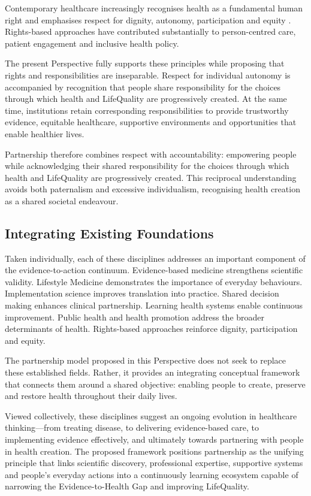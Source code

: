 \documentclass{article}
\begin{document}
Contemporary healthcare increasingly recognises health as a fundamental human right and emphasises respect for dignity, autonomy, participation and equity \cite{WHO1948} \cite{UN1948} \cite{UNICESCR1966}. Rights-based approaches have contributed substantially to person-centred care, patient engagement and inclusive health policy.

The present Perspective fully supports these principles while proposing that rights and responsibilities are inseparable. Respect for individual autonomy is accompanied by recognition that people share responsibility for the choices through which health and LifeQuality are progressively created. At the same time, institutions retain corresponding responsibilities to provide trustworthy evidence, equitable healthcare, supportive environments and opportunities that enable healthier lives.

Partnership therefore combines respect with accountability: empowering people while acknowledging their shared responsibility for the choices through which health and LifeQuality are progressively created. This reciprocal understanding avoids both paternalism and excessive individualism, recognising health creation as a shared societal endeavour.
\subsection{Integrating Existing Foundations}
\label{sec:org78aa8ed}

Taken individually, each of these disciplines addresses an important component of the evidence-to-action continuum. Evidence-based medicine strengthens scientific validity. Lifestyle Medicine demonstrates the importance of everyday behaviours. Implementation science improves translation into practice. Shared decision making enhances clinical partnership. Learning health systems enable continuous improvement. Public health and health promotion address the broader determinants of health. Rights-based approaches reinforce dignity, participation and equity.

The partnership model proposed in this Perspective does not seek to replace these established fields. Rather, it provides an integrating conceptual framework that connects them around a shared objective: enabling people to create, preserve and restore health throughout their daily lives.

Viewed collectively, these disciplines suggest an ongoing evolution in healthcare thinking—from treating disease, to delivering evidence-based care, to implementing evidence effectively, and ultimately towards partnering with people in health creation. The proposed framework positions partnership as the unifying principle that links scientific discovery, professional expertise, supportive systems and people's everyday actions into a continuously learning ecosystem capable of narrowing the Evidence-to-Health Gap and improving LifeQuality.
\end{document}
